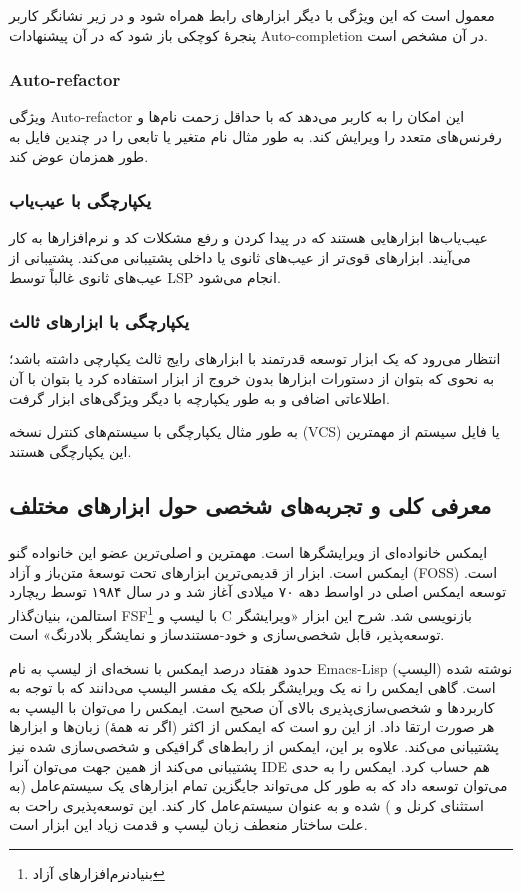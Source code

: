 \documentclass[a4paper]{article}
\begin{document}
معمول است که این ویژگی با دیگر ابزارهای رابط همراه شود و در زیر نشانگر کاربر
پنجرهٔ کوچکی باز شود که در آن پیشنهادات Auto-completion در آن مشخص است.

\subsubsection{Auto-refactor}
ویژگی Auto-refactor این امکان را به کاربر می‌دهد که با حداقل زحمت نام‌ها و رفرنس‌های
متعدد را ویرایش کند.
به طور مثال نام متغیر یا تابعی را در چندین فایل به طور همزمان عوض کند.

\subsubsection{یکپارچگی با عیب‌یاب}
عیب‌یاب‌ها ابزارهایی هستند که در پیدا کردن و رفع مشکلات کد و نرم‌افزارها به کار
می‌آیند. ابزارهای قوی‌تر از عیب‌های ثانوی یا داخلی پشتیبانی می‌کند.
پشتیبانی از عیب‌های ثانوی غالباً توسط LSP انجام می‌شود.

\subsubsection{یکپارچگی با ابزارهای ثالث}
انتظار می‌رود که یک ابزار توسعه قدرتمند با ابزارهای رایج ثالث یکپارچی داشته باشد؛
به نحوی که بتوان از دستورات ابزارها بدون خروج از ابزار استفاده کرد یا بتوان با آن
اطلاعاتی اضافی و به طور یکپارچه با دیگر ویژگی‌های ابزار گرفت.

به طور مثال یکپارچگی با سیستم‌های کنترل نسخه (VCS) یا فایل سیستم از مهمترین این یکپارچگی هستند.

\subsection{معرفی کلی و تجربه‌های شخصی حول ابزارهای مختلف}
\subsubsection{}
ایمکس خانواده‌ای از ویرایشگرها است. مهمترین و اصلی‌ترین عضو این خانواده گنو ایمکس است.
ابزار  از قدیمی‌ترین ابزارهای تحت توسعهٔ متن‌باز و آزاد (FOSS) است.
توسعه ایمکس اصلی در اواسط دهه ۷۰ میلادی آغاز شد و  در سال ۱۹۸۴
توسط ریچارد استالمن، بنیان‌گذار FSF\footnote{بنیادنرم‌افزارهای آزاد } با لیسپ و C بازنویسی شد.
شرح این ابزار «ویرایشگر توسعه‌پذیر، قابل شخصی‌سازی و خود-مستندساز و نمایشگر بلادرنگ»
است.

حدود هفتاد درصد ایمکس با نسخه‌ای از لیسپ به نام Emacs-Lisp (الیسپ) نوشته شده است.
گاهی ایمکس را نه یک ویرایشگر بلکه یک مفسر الیسپ می‌دانند که با توجه به کاربردها و
شخصی‌سازی‌پذیری بالای آن صحیح است. ایمکس را می‌توان با الیسپ به هر صورت ارتقا داد.
از این رو است که ایمکس از اکثر (اگر نه همهٔ) زبان‌ها و ابزارها پشتیبانی می‌کند.
علاوه بر این، ایمکس از رابط‌های گرافیکی و شخصی‌سازی شده نیز پشتیبانی می‌کند از همین جهت می‌توان آنرا
IDE هم حساب کرد.
ایمکس را به حدی می‌توان توسعه داد که به طور کل می‌تواند جایگزین تمام ابزارهای یک
سیستم‌عامل (به استثنای کرنل و ) شده و به عنوان سیستم‌عامل کار کند. این
توسعه‌پذیری راحت به علت ساختار منعطف زبان لیسپ و قدمت زیاد این ابزار است.
\end{document}
